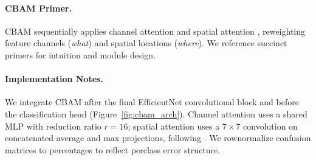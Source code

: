 \paragraph{CBAM Primer.} CBAM sequentially applies channel attention and spatial attention \cite{woo2018cbam}, reweighting feature channels (\emph{what}) and spatial locations (\emph{where}). We reference succinct primers \cite{cbamMedium,cbamDO} for intuition and module design.

\paragraph{Implementation Notes.} We integrate CBAM after the final EfficientNet convolutional block and before the classification head (Figure~\ref{fig:cbam_arch}). Channel attention uses a shared MLP with reduction ratio $r=16$; spatial attention uses a $7\times7$ convolution on concatenated average and max projections, following \cite{woo2018cbam,cbamDO}. We row\textendash normalize confusion matrices to percentages to reflect per\textendash class error structure.

